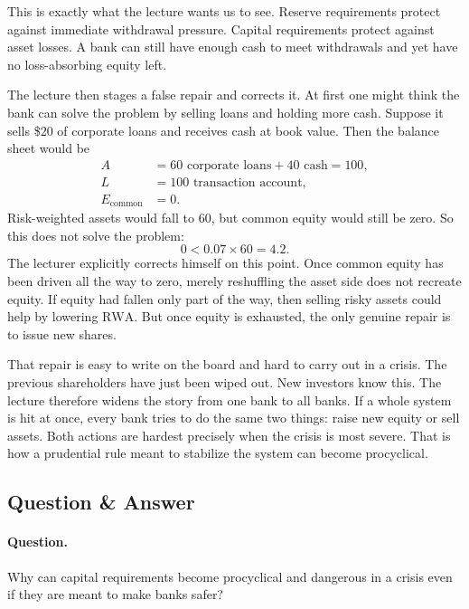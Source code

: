 This is exactly what the lecture wants us to see. Reserve requirements protect against immediate withdrawal pressure. Capital requirements protect against asset losses. A bank can still have enough cash to meet withdrawals and yet have no loss-absorbing equity left.

The lecture then stages a false repair and corrects it. At first one might think the bank can solve the problem by selling loans and holding more cash. Suppose it sells \$20 of corporate loans and receives cash at book value. Then the balance sheet would be
\begin{align}
A &= 60 \text{ corporate loans} + 40 \text{ cash} = 100, \\
L &= 100 \text{ transaction account}, \\
E_{\text{common}} &= 0.
\end{align}
Risk-weighted assets would fall to \(60\), but common equity would still be zero. So this does not solve the problem:
\begin{equation}
0 < 0.07 \times 60 = 4.2.
\end{equation}
The lecturer explicitly corrects himself on this point. Once common equity has been driven all the way to zero, merely reshuffling the asset side does not recreate equity. If equity had fallen only part of the way, then selling risky assets could help by lowering \(\text{RWA}\). But once equity is exhausted, the only genuine repair is to issue new shares.

That repair is easy to write on the board and hard to carry out in a crisis. The previous shareholders have just been wiped out. New investors know this. The lecture therefore widens the story from one bank to all banks. If a whole system is hit at once, every bank tries to do the same two things: raise new equity or sell assets. Both actions are hardest precisely when the crisis is most severe. That is how a prudential rule meant to stabilize the system can become procyclical.

\subsection{Question \& Answer}

\paragraph{Question.} Why can capital requirements become procyclical and dangerous in a crisis even if they are meant to make banks safer?

